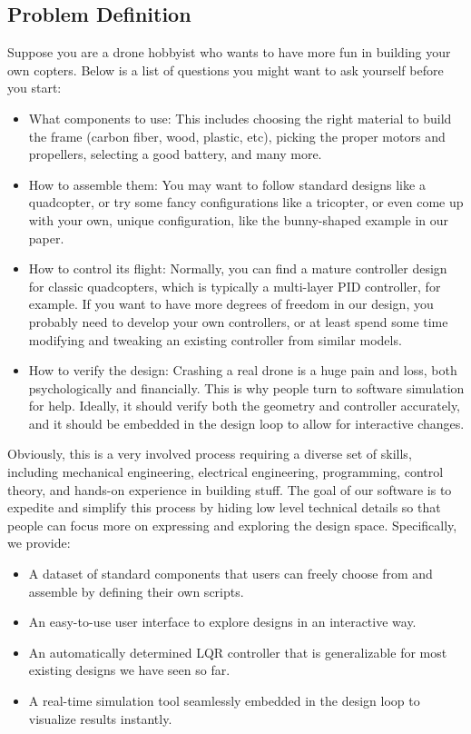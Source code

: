 \subsection{Problem Definition}
Suppose you are a drone hobbyist who wants to have more fun in building your own copters. Below is a list of questions you might want to ask yourself before you start:
\begin{itemize}
\item What components to use: This includes choosing the right material to build the frame (carbon fiber, wood, plastic, etc), picking the proper motors and propellers, selecting a good battery, and many more.

\item How to assemble them: You may want to follow standard designs like a quadcopter, or try some fancy configurations like a tricopter, or even come up with your own, unique configuration, like the bunny-shaped example in our paper.

\item How to control its flight: Normally, you can find a mature controller design for classic quadcopters, which is typically a multi-layer PID controller, for example. If you want to have more degrees of freedom in our design, you probably need to develop your own controllers, or at least spend some time modifying and tweaking an existing controller from similar models.

\item How to verify the design: Crashing a real drone is a huge pain and loss, both psychologically and financially. This is why people turn to software simulation for help. Ideally, it should verify both the geometry and controller accurately, and it should be embedded in the design loop to allow for interactive changes.
\end{itemize}
Obviously, this is a very involved process requiring a diverse set of skills, including mechanical engineering, electrical engineering, programming, control theory, and hands-on experience in building stuff. The goal of our software is to expedite and simplify this process by hiding low level technical details so that people can focus more on expressing and exploring the design space. Specifically, we provide:
\begin{itemize}
\item A dataset of standard components that users can freely choose from and assemble by defining their own scripts.
\item An easy-to-use user interface to explore designs in an interactive way.
\item An automatically determined LQR controller that is generalizable for most existing designs we have seen so far.
\item A real-time simulation tool seamlessly embedded in the design loop to visualize results instantly.
\end{itemize}

